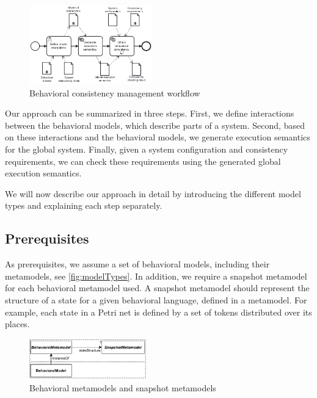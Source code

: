 \documentclass{jot}
\begin{document}
\begin{figure}[h]
    \centering
    \includegraphics[width=0.475\textwidth]{figures/workflow.pdf}
    \caption{Behavioral consistency management workflow}
    \label{fig:approach}
\end{figure}

Our approach can be summarized in three steps.
First, we define interactions between the behavioral models, which describe parts of a system.
Second, based on these interactions and the behavioral models, we generate execution semantics for the global system.
Finally, given a system configuration and consistency requirements, we can check these requirements using the generated global execution semantics.

We will now describe our approach in detail by introducing the different model types and explaining each step separately.

\subsection{Prerequisites}
As prerequisites, we assume a set of behavioral models, including their metamodels, see \autoref{fig:modelTypes}.
In addition, we require a snapshot metamodel for each behavioral metamodel used.
A snapshot metamodel should represent the structure of a state for a given behavioral language, defined in a metamodel.
For example, each state in a Petri net is defined by a set of tokens distributed over its places.

\begin{figure}[h]
    \centering
    \includegraphics[width=0.45\textwidth]{figures/modelTypes.pdf}
    \caption{Behavioral metamodels and snapshot metamodels}
    \label{fig:modelTypes}
\end{figure}
\end{document}
